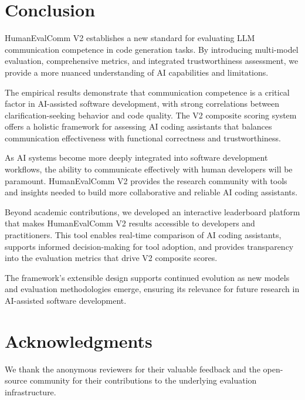 \documentclass[conference]{IEEEtran}
\begin{document}
\section{Conclusion}

HumanEvalComm V2 establishes a new standard for evaluating LLM communication competence in code generation tasks. By introducing multi-model evaluation, comprehensive metrics, and integrated trustworthiness assessment, we provide a more nuanced understanding of AI capabilities and limitations.

The empirical results demonstrate that communication competence is a critical factor in AI-assisted software development, with strong correlations between clarification-seeking behavior and code quality. The V2 composite scoring system offers a holistic framework for assessing AI coding assistants that balances communication effectiveness with functional correctness and trustworthiness.

As AI systems become more deeply integrated into software development workflows, the ability to communicate effectively with human developers will be paramount. HumanEvalComm V2 provides the research community with tools and insights needed to build more collaborative and reliable AI coding assistants.

Beyond academic contributions, we developed an interactive leaderboard platform that makes HumanEvalComm V2 results accessible to developers and practitioners. This tool enables real-time comparison of AI coding assistants, supports informed decision-making for tool adoption, and provides transparency into the evaluation metrics that drive V2 composite scores.

The framework's extensible design supports continued evolution as new models and evaluation methodologies emerge, ensuring its relevance for future research in AI-assisted software development.

\section*{Acknowledgments}

We thank the anonymous reviewers for their valuable feedback and the open-source community for their contributions to the underlying evaluation infrastructure.



\end{document}

